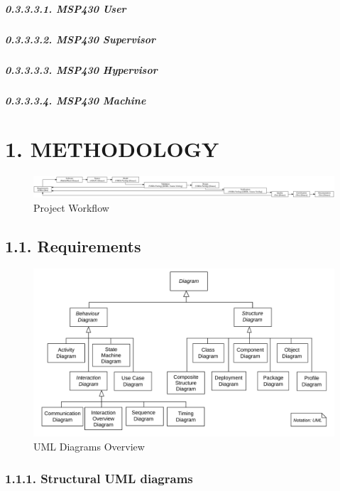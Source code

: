 \documentclass[
]{article}
\begin{document}
\hypertarget{msp430-user}{%
\subparagraph{0.3.3.3.1. MSP430 User}\label{msp430-user}}

\hypertarget{msp430-supervisor}{%
\subparagraph{0.3.3.3.2. MSP430 Supervisor}\label{msp430-supervisor}}

\hypertarget{msp430-hypervisor}{%
\subparagraph{0.3.3.3.3. MSP430 Hypervisor}\label{msp430-hypervisor}}

\hypertarget{msp430-machine}{%
\subparagraph{0.3.3.3.4. MSP430 Machine}\label{msp430-machine}}

\hypertarget{methodology}{%
\section{1. METHODOLOGY}\label{methodology}}

\begin{figure}
\centering
\includegraphics{../doc/project.svg}
\caption{Project Workflow}
\end{figure}

\hypertarget{requirements}{%
\subsection{1.1. Requirements}\label{requirements}}

\begin{figure}
\centering
\includegraphics{../requirements/uml_diagrams_overview.svg}
\caption{UML Diagrams Overview}
\end{figure}

\hypertarget{structural-uml-diagrams}{%
\subsubsection{1.1.1. Structural UML
diagrams}\label{structural-uml-diagrams}}
\end{document}
